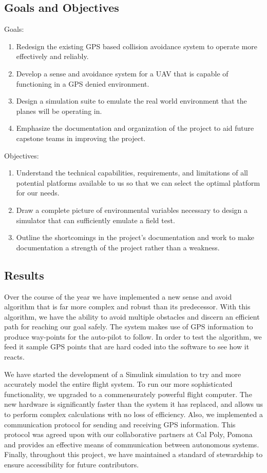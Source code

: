 \documentclass[12pt]{article}
\begin{document}
\subsection{Goals and Objectives}
Goals:
\begin{enumerate}
\item Redesign the existing GPS based collision avoidance system to operate more effectively and reliably.
\item Develop a sense and avoidance system for a UAV that is capable of functioning in a GPS denied environment.
\item Design a simulation suite to emulate the real world environment that the planes will be operating in.
\item Emphasize the documentation and organization of the project to aid future capstone teams in improving the project.
\end{enumerate}
Objectives:
\begin{enumerate}
\item Understand the technical capabilities, requirements, and limitations of all potential platforms available to us so that we can select the optimal platform for our needs.
\item Draw a complete picture of environmental variables necessary to design a simulator that can sufficiently emulate a field test.
\item Outline the shortcomings in the project's documentation and work to make documentation a strength of the project rather than a weakness.
\end{enumerate}

\subsection{Results}
Over the course of the year we have implemented a new sense and avoid algorithm that is far more complex and robust than its predecessor. With this algorithm, we have the ability to avoid multiple obstacles and discern an efficient path for reaching our goal safely. The system makes use of GPS information to produce way-points for the auto-pilot to follow. In order to test the algorithm, we feed it sample GPS points that are hard coded into the software to see how it reacts.

We have started the development of a Simulink simulation to try and more accurately model the entire flight system. To run our more sophisticated functionality, we upgraded to a commensurately powerful flight computer. The new hardware is significantly faster than the system it has replaced, and allows us to perform complex calculations with no loss of efficiency. Also, we implemented a communication protocol for sending and receiving GPS information. This protocol was agreed upon with our collaborative partners at Cal Poly, Pomona and provides an effective means of communication between autonomous systems. Finally, throughout this project, we have maintained a standard of stewardship to ensure accessibility for future contributors.
\end{document}
